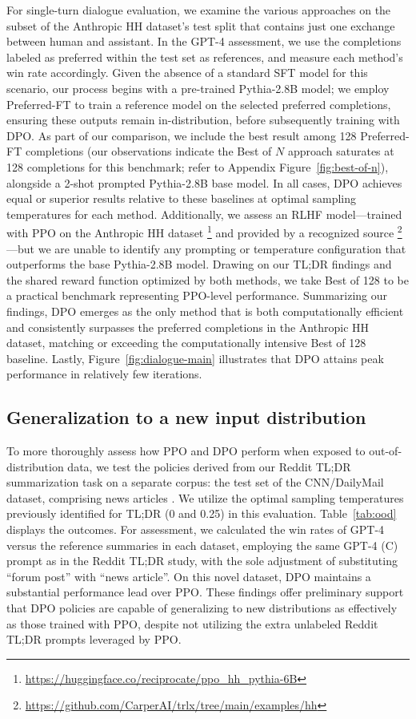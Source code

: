 For single-turn dialogue evaluation, we examine the various approaches on the subset of the Anthropic HH dataset’s test split \citep{bai2022training} that contains just one exchange between human and assistant. In the GPT-4 assessment, we use the completions labeled as preferred within the test set as references, and measure each method’s win rate accordingly. Given the absence of a standard SFT model for this scenario, our process begins with a pre-trained Pythia-2.8B model; we employ Preferred-FT to train a reference model on the selected preferred completions, ensuring these outputs remain in-distribution, before subsequently training with DPO. As part of our comparison, we include the best result among 128 Preferred-FT completions (our observations indicate the Best of $N$ approach saturates at 128 completions for this benchmark; refer to Appendix Figure~\ref{fig:best-of-n}), alongside a 2-shot prompted Pythia-2.8B base model. In all cases, DPO achieves equal or superior results relative to these baselines at optimal sampling temperatures for each method. Additionally, we assess an RLHF model—trained with PPO on the Anthropic HH dataset \footnote{\url{https://huggingface.co/reciprocate/ppo_hh_pythia-6B}} and provided by a recognized source \footnote{\url{https://github.com/CarperAI/trlx/tree/main/examples/hh}}—but we are unable to identify any prompting or temperature configuration that outperforms the base Pythia-2.8B model. Drawing on our TL;DR findings and the shared reward function optimized by both methods, we take Best of 128 to be a practical benchmark representing PPO-level performance. Summarizing our findings, DPO emerges as the only method that is both computationally efficient and consistently surpasses the preferred completions in the Anthropic HH dataset, matching or exceeding the computationally intensive Best of 128 baseline. Lastly, Figure~\ref{fig:dialogue-main} illustrates that DPO attains peak performance in relatively few iterations.

\subsection{Generalization to a new input distribution}

To more thoroughly assess how PPO and DPO perform when exposed to out-of-distribution data, we test the policies derived from our Reddit TL;DR summarization task on a separate corpus: the test set of the CNN/DailyMail dataset, comprising news articles \citep{nallapati-etal-2016-abstractive}. We utilize the optimal sampling temperatures previously identified for TL;DR (0 and 0.25) in this evaluation. Table~\ref{tab:ood} displays the outcomes. For assessment, we calculated the win rates of GPT-4 versus the reference summaries in each dataset, employing the same GPT-4 (C) prompt as in the Reddit TL;DR study, with the sole adjustment of substituting ``forum post'' with ``news article''. On this novel dataset, DPO maintains a substantial performance lead over PPO. These findings offer preliminary support that DPO policies are capable of generalizing to new distributions as effectively as those trained with PPO, despite not utilizing the extra unlabeled Reddit TL;DR prompts leveraged by PPO.

